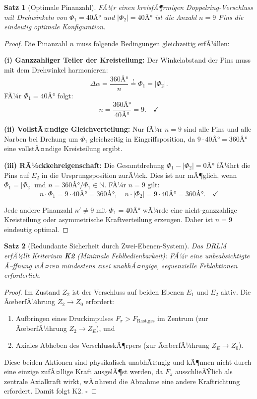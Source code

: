 ﻿\documentclass[12pt, a4paper]{article}
\newtheorem{theorem}{Satz}[section]
\theoremstyle{remark}
\begin{document}
\begin{theorem}[Optimale Pinanzahl]
  \label{thm:pinoptimal}
  FÃ¼r einen kreisfÃ¶rmigen Doppelring-Verschluss mit Drehwinkeln von $\Phi_1 = 40Â°$ und
  $|\Phi_2| = 40Â°$ ist die Anzahl $n = 9$ Pins die eindeutig optimale Konfiguration.
\end{theorem}

\begin{proof}
  Die Pinanzahl $n$ muss folgende Bedingungen gleichzeitig erfÃ¼llen:

  \textbf{(i) Ganzzahliger Teiler der Kreisteilung:}
  Der Winkelabstand der Pins muss mit dem Drehwinkel harmonieren:
  \[
    \Delta\alpha = \frac{360Â°}{n} \overset{!}{=} \Phi_1 = |\Phi_2|.
  \]
  FÃ¼r $\Phi_1 = 40Â°$ folgt:
  \[
    n = \frac{360Â°}{40Â°} = 9. \quad \checkmark
  \]

  \textbf{(ii) VollstÃ¤ndige Gleichverteilung:}
  Nur fÃ¼r $n = 9$ sind alle Pins und alle Narben bei Drehung um $\Phi_1$ gleichzeitig in
  Eingriffsposition, da $9 \cdot 40Â° = 360Â°$ eine vollstÃ¤ndige Kreisteilung ergibt.

  \textbf{(iii) RÃ¼ckkehreigenschaft:}
  Die Gesamtdrehung $\Phi_1 - |\Phi_2| = 0Â°$ fÃ¼hrt die Pins auf $E_2$ in die
  Ursprungsposition zurÃ¼ck. Dies ist nur mÃ¶glich, wenn $\Phi_1 = |\Phi_2|$ und
  $n = 360Â°/\Phi_1 \in \mathbb{N}$. FÃ¼r $n=9$ gilt:
  \[
    n \cdot \Phi_1 = 9 \cdot 40Â° = 360Â°, \quad n \cdot |\Phi_2| = 9 \cdot 40Â° = 360Â°. \quad \checkmark
  \]

  Jede andere Pinanzahl $n' \neq 9$ mit $\Phi_1 = 40Â°$ wÃ¼rde eine nicht-ganzzahlige
  Kreisteilung oder asymmetrische Kraftverteilung erzeugen. Daher ist $n = 9$ eindeutig optimal.
\end{proof}

\begin{theorem}[Redundante Sicherheit durch Zwei-Ebenen-System]
  \label{thm:redundanz}
  Das DRLM erfÃ¼llt Kriterium \textbf{K2} (Minimale Fehlbedienbarkeit): FÃ¼r eine
  unbeabsichtigte Ã–ffnung wÃ¤ren mindestens zwei unabhÃ¤ngige, sequenzielle Fehlaktionen
  erforderlich.
\end{theorem}

\begin{proof}
  Im Zustand $Z_2$ ist der Verschluss auf beiden Ebenen $E_1$ und $E_2$ aktiv. Die
  ÃœberfÃ¼hrung $Z_2 \to Z_0$ erfordert:
  \begin{enumerate}
    \item Aufbringen eines Druckimpulses $F_\pi > F_{\text{Rast,ges}}$ im Zentrum
          (zur ÃœberfÃ¼hrung $Z_2 \to Z_E$), und
    \item Axiales Abheben des VerschlusskÃ¶rpers (zur ÃœberfÃ¼hrung $Z_E \to Z_0$).
  \end{enumerate}
  Diese beiden Aktionen sind physikalisch unabhÃ¤ngig und kÃ¶nnen nicht durch eine einzige
  zufÃ¤llige Kraft ausgelÃ¶st werden, da $F_\pi$ ausschlieÃŸlich als zentrale Axialkraft wirkt,
  wÃ¤hrend die Abnahme eine andere Kraft\-richtung erfordert. Damit folgt K2. $\square$
\end{proof}
\end{document}
